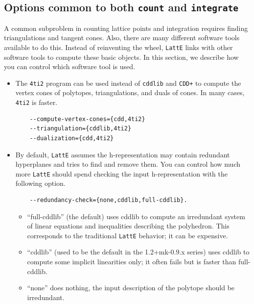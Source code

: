 \documentclass{article}
\newcommand{\latte}{{\tt LattE}\xspace}
\newcommand{\fourtitwo}{{\tt 4ti2}\xspace}
\begin{document}
\subsection{Options common to both {\tt count} and {\tt integrate}}

A common subproblem in counting lattice points and integration requires finding triangulations and tangent cones. Also, there are many different software tools available to do this. Instead of reinventing the wheel, \latte links with other software tools to compute these basic objects. In this section, we describe how you can control which software tool is used.

\begin{itemize}
\item The \fourtitwo program can be used instead of {\tt cddlib} and {\tt CDD+}
  to compute the vertex cones of polytopes, triangulations, and duals of cones.
  In many cases, \fourtitwo is faster.
  
  \begin{verbatim}
	--compute-vertex-cones={cdd,4ti2}
	--triangulation={cddlib,4ti2}
	--dualization={cdd,4ti2}
  \end{verbatim}

\item By default, \latte assumes the h-representation may contain redundant hyperplanes and tries to find and remove them. You can control how much more \latte should spend checking the input h-representation with the following option.

	\begin{verbatim}
	--redundancy-check={none,cddlib,full-cddlib}.
	\end{verbatim}

	\begin{itemize}
  	\item ``full-cddlib'' (the default) uses cddlib to compute an irredundant
    system of linear equations and inequalities describing the
    polyhedron.  This corresponds to the traditional \latte behavior;
    it can be expensive.

	\item ``cddlib'' (used to be the default in the 1.2+mk-0.9.x series) uses
    cddlib to compute some implicit linearities only; it often fails
    but is faster than full-cddlib.

	\item ``none'' does nothing, the input description of the polytope should
    be irredundant.
		
	\end{itemize}

\end{itemize}
\end{document}
